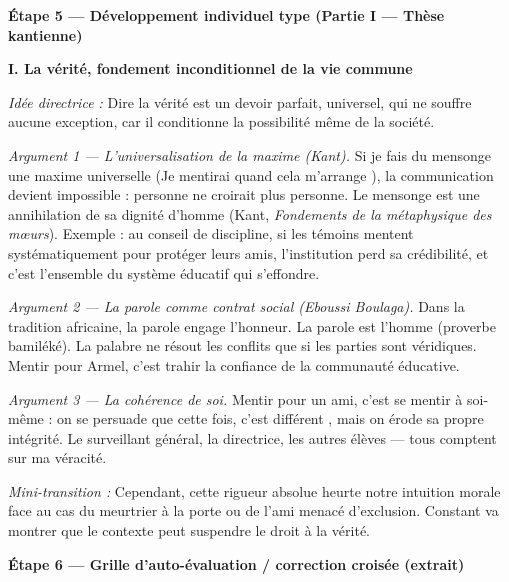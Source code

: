 \documentclass[11pt]{article}
\newcommand{\cle}[1]{{\popxbold\color{popdark}#1}}
\begin{document}
\begin{exoresolu}
\textbf{Étape 5 — Développement individuel type (Partie I — Thèse kantienne)}

\guillemotleft \textbf{I. La vérité, fondement inconditionnel de la vie commune}

\textit{Idée directrice :} Dire la vérité est un devoir parfait, universel, qui ne souffre aucune exception, car il conditionne la possibilité même de la société.

\textit{Argument 1 — L'universalisation de la maxime (Kant).} Si je fais du mensonge une maxime universelle (\guillemotleft Je mentirai quand cela m'arrange \guillemotright), la communication devient impossible : personne ne croirait plus personne. \guillemotleft Le mensonge est une annihilation de sa dignité d'homme \guillemotright (Kant, \emph{Fondements de la métaphysique des mœurs}). Exemple : au conseil de discipline, si les témoins mentent systématiquement pour protéger leurs amis, l'institution perd sa crédibilité, et c'est l'ensemble du système éducatif qui s'effondre.

\textit{Argument 2 — La parole comme contrat social (Eboussi Boulaga).} Dans la tradition africaine, la \cle{parole} engage l'honneur. \guillemotleft La parole est l'homme \guillemotright (proverbe bamiléké). La palabre ne résout les conflits que si les parties sont véridiques. Mentir pour Armel, c'est trahir la confiance de la communauté éducative.

\textit{Argument 3 — La cohérence de soi.} Mentir pour un ami, c'est se mentir à soi-même : on se persuade que \guillemotleft cette fois, c'est différent \guillemotright, mais on érode sa propre intégrité. Le surveillant général, la directrice, les autres élèves — tous comptent sur ma véracité.

\textit{Mini-transition :} Cependant, cette rigueur absolue heurte notre intuition morale face au cas du meurtrier à la porte ou de l'ami menacé d'exclusion. Constant va montrer que le contexte peut suspendre le droit à la vérité.\guillemotright

\textbf{Étape 6 — Grille d'auto-évaluation / correction croisée (extrait)}


\end{exoresolu}
\end{document}
